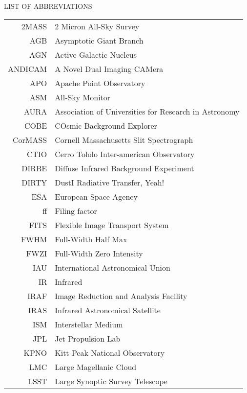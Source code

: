 
\begin{center}
LIST OF ABBREVIATIONS
\end{center}

\begin{tabular}{rl}
2MASS     &     2 Micron All-Sky Survey\\
AGB       &     Asymptotic Giant Branch \\
AGN       &     Active Galactic Nucleus\\
ANDICAM   &     A Novel Dual Imaging CAMera\\
APO       &     Apache Point Observatory\\
ASM       &     All-Sky Monitor\\
AURA      &     Association of Universities for Research in Astronomy\\
COBE      &     COsmic Background Explorer\\
CorMASS   &     Cornell Massachusetts Slit Spectrograph\\
CTIO      &     Cerro Tololo Inter-american Observatory\\
DIRBE     &     Diffuse Infrared Background Experiment\\
DIRTY     &     DustI Radiative Transfer, Yeah!\\
ESA       &     European Space Agency\\
ff        &     Filing factor\\
FITS      &     Flexible Image Transport System\\
FWHM      &     Full-Width Half Max\\
FWZI      &     Full-Width Zero Intensity\\
IAU       &     International Astronomical Union\\
IR        &     Infrared\\
IRAF      &     Image Reduction and Analysis Facility\\
IRAS      &     Infrared Astronomical Satellite\\
ISM       &     Interstellar Medium\\
JPL       &     Jet Propulsion Lab\\
KPNO      &     Kitt Peak National Observatory\\
LMC       &     Large Magellanic Cloud\\
LSST      &     Large Synoptic Survey Telescope\\

\end{tabular}
